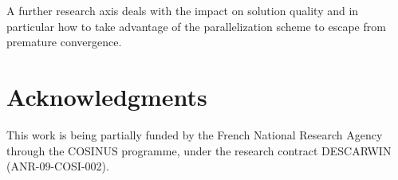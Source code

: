 \documentclass{sig-alternate}
\begin{document}
A further research axis deals with the impact on solution quality and in
particular how to take advantage of the parallelization scheme to escape from
premature convergence.

\section{Acknowledgments}
This work is being partially funded by the French National Research Agency through the COSINUS programme, under the research contract DESCARWIN (ANR-09-COSI-002).


%

%
%
\end{document}
